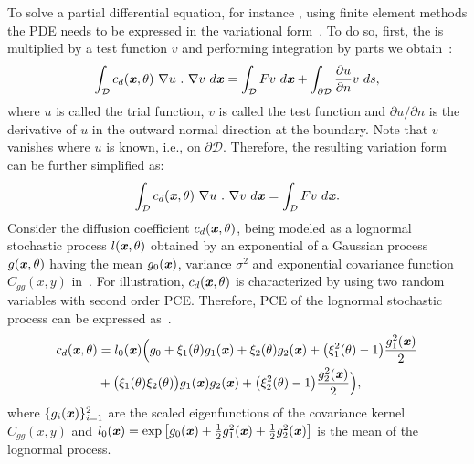 \documentclass[letter,1p,11pt,oneside,onecolumn,sort&compress]{elsarticle}
\begin{document}
To solve a partial differential equation, for instance , using finite element methods the PDE needs to be expressed in the variational form~\cite{le2010spectral,ciarlet2002finite}. To do so, first, the  is multiplied by a test function $v$ and performing integration by parts we obtain~\cite{ciarlet2002finite}:
\begin{align}
  \int_{\mathcal{D}} c_d(\textbf{\textit{x}},\theta) \ \nabla u \ . \ \nabla v \ d\textbf{\textit{x}} = \int_{\mathcal{D}} F v \ d\textbf{\textit{x}} + \int_{\mathcal{\partial D}} \frac{\partial u}{\partial n} v \ ds,
\end{align}
where $u$ is called the trial function, $v$ is called the test function and ${\partial u}/{\partial n}$ is the derivative of $u$ in the outward normal direction at the boundary.
Note that $v$ vanishes where $u$ is known, i.e., on ${\mathcal{\partial D}}$.
Therefore, the resulting variation form can be further simplified as:
\begin{align}\label{eq:stoVar}
  \int_{\mathcal{D}} c_d(\textbf{\textit{x}},\theta) \ \nabla u \ . \ \nabla v \ d\textbf{\textit{x}} = \int_{\mathcal{D}} F v \ d\textbf{\textit{x}}.
\end{align}
Consider the diffusion coefficient $c_d(\textbf{\textit{x}},\theta)$, being modeled as a lognormal stochastic process $l(\textbf{\textit{x}},\theta)$ obtained by an exponential of a Gaussian process $g(\textbf{\textit{x}},\theta)$ having the mean $g_0(\textbf{\textit{x}})$, variance $\sigma^2$ and exponential covariance function $C_{gg}(x,y)$ in~. For illustration, $c_d(\textbf{\textit{x}},\theta)$
is characterized by using two random variables with second order PCE. Therefore, PCE of the lognormal stochastic process can be expressed as~\cite{ghanemSFEM1991}. %
\begin{align}\label{eq:cp2_logPCE3}
c_d(\textbf{\textit{x}},\theta) &= l_0(\textbf{\textit{x}}) \Big( g_0 + \xi_1(\theta) g_1(\textbf{\textit{x}}) + \xi_2(\theta) g_2(\textbf{\textit{x}}) + \big( \xi_1^2(\theta)-1 \big) \frac{g_1^2(\textbf{\textit{x}})}{2} \nonumber \\
&+  \big( \xi_1(\theta) \xi_2(\theta) \big) g_1(\textbf{\textit{x}}) g_2(\textbf{\textit{x}}) + \big( \xi_2^2(\theta)-1 \big) \frac{g_2^2(\textbf{\textit{x}})}{2} \Big),
\end{align}
where $\{ g_i(\textbf{\textit{x}}) \}_{i=1}^2$ are the scaled eigenfunctions of the covariance kernel $C_{gg}(x,y)$ and
$l_0(\textbf{\textit{x}}) = \mathrm{exp} \left[ g_0(\textbf{\textit{x}}) + \frac{1}{2} g_1^2(\textbf{\textit{x}}) + \frac{1}{2} g_2^2(\textbf{\textit{x}}) \right]$ is the mean of the lognormal process.
\end{document}
